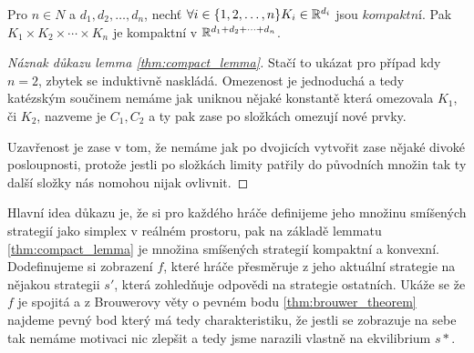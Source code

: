 \begin{theorem}
\label{thm:compact_lemma}
Pro $n \in N$ a $d_1,d_2,\dots,d_n$, nechť $\forall i \in \{1,2,\dots,n\} K_i \in \mathbb{R}^{d_i}$ jsou $kompaktní$. 
Pak $K_1 \times K_2 \times \cdots \times K_n$ je kompaktní v $\mathbb{R}^{d_1 + d_2 + \dots + d_n}$. 
\end{theorem}
\begin{proof}[Náznak důkazu lemma \ref{thm:compact_lemma}]
Stačí to ukázat pro případ kdy $n =2$, zbytek se induktivně naskládá. 
Omezenost je jednoduchá a tedy katézským součinem nemáme jak uniknou nějaké konstantě která omezovala $K_1$, či $K_2$, nazveme je $C_1, C_2$ a ty pak zase po složkách omezují nové prvky. 

Uzavřenost je zase v tom, že nemáme jak po dvojicích vytvořit zase nějaké divoké posloupnosti, protože jestli po složkách limity patřily do původních množin tak ty další složky nás nomohou nijak ovlivnit. 
\end{proof}
Hlavní idea důkazu je, že si pro každého hráče definijeme jeho množinu smíšených strategií jako simplex v reálném prostoru, pak na základě lemmatu \ref{thm:compact_lemma} je množina smíšených strategií kompaktní a konvexní. 
Dodefinujeme si zobrazení $f$, které hráče přesměruje z jeho aktuální strategie na nějakou strategii $s'$, která zohledňuje odpovědi na strategie ostatních. 
Ukáže se že $f$ je spojitá a z Brouwerovy věty o pevném bodu \ref{thm:brouwer_theorem} najdeme pevný bod který má tedy charakteristiku, že jestli se zobrazuje na sebe tak nemáme motivaci nic zlepšit a tedy jsme narazili vlastně na ekvilibrium $s*$. 
